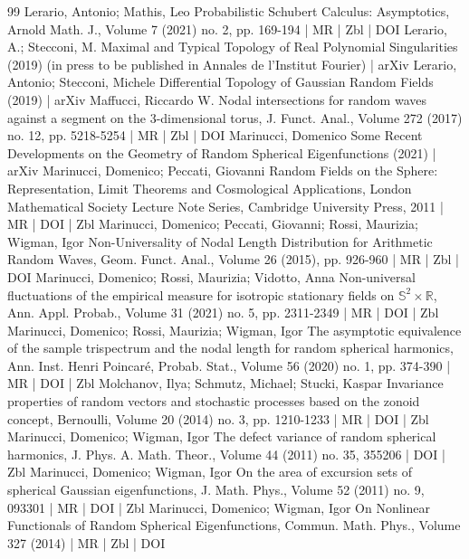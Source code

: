 \documentclass[10pt]{amsart}
\theoremstyle{definition}\newtheorem{defi}[theo]{Definition}\newtheorem{rema}[theo]{Remark}\newtheorem{exam}[theo]{Example}\newtheorem{exem}[theo]{Example}\newtheorem{nota}[theo]{Notation}
\begin{document}
\begin{thebibliography}{99}
Lerario, Antonio; Mathis, Leo Probabilistic Schubert Calculus: Asymptotics, Arnold Math. J., Volume 7 (2021) no. 2, pp. 169-194 | MR | Zbl | DOI
Lerario, A.; Stecconi, M. Maximal and Typical Topology of Real Polynomial Singularities (2019) (in press to be published in Annales de l’Institut Fourier) | arXiv
Lerario, Antonio; Stecconi, Michele Differential Topology of Gaussian Random Fields (2019) | arXiv
Maffucci, Riccardo W. Nodal intersections for random waves against a segment on the 3-dimensional torus, J. Funct. Anal., Volume 272 (2017) no. 12, pp. 5218-5254 | MR | Zbl | DOI
Marinucci, Domenico Some Recent Developments on the Geometry of Random Spherical Eigenfunctions (2021) | arXiv
Marinucci, Domenico; Peccati, Giovanni Random Fields on the Sphere: Representation, Limit Theorems and Cosmological Applications, London Mathematical Society Lecture Note Series, Cambridge University Press, 2011 | MR | DOI | Zbl
Marinucci, Domenico; Peccati, Giovanni; Rossi, Maurizia; Wigman, Igor Non-Universality of Nodal Length Distribution for Arithmetic Random Waves, Geom. Funct. Anal., Volume 26 (2015), pp. 926-960 | MR | Zbl | DOI
Marinucci, Domenico; Rossi, Maurizia; Vidotto, Anna Non-universal fluctuations of the empirical measure for isotropic stationary fields on ${\mathbb{S}^{2}}\times \mathbb{R}$, Ann. Appl. Probab., Volume 31 (2021) no. 5, pp. 2311-2349 | MR | DOI | Zbl
Marinucci, Domenico; Rossi, Maurizia; Wigman, Igor The asymptotic equivalence of the sample trispectrum and the nodal length for random spherical harmonics, Ann. Inst. Henri Poincaré, Probab. Stat., Volume 56 (2020) no. 1, pp. 374-390 | MR | DOI | Zbl
Molchanov, Ilya; Schmutz, Michael; Stucki, Kaspar Invariance properties of random vectors and stochastic processes based on the zonoid concept, Bernoulli, Volume 20 (2014) no. 3, pp. 1210-1233 | MR | DOI | Zbl
Marinucci, Domenico; Wigman, Igor The defect variance of random spherical harmonics, J. Phys. A. Math. Theor., Volume 44 (2011) no. 35, 355206 | DOI | Zbl
Marinucci, Domenico; Wigman, Igor On the area of excursion sets of spherical Gaussian eigenfunctions, J. Math. Phys., Volume 52 (2011) no. 9, 093301 | MR | DOI | Zbl
Marinucci, Domenico; Wigman, Igor On Nonlinear Functionals of Random Spherical Eigenfunctions, Commun. Math. Phys., Volume 327 (2014) | MR | Zbl | DOI

\end{thebibliography}
\end{document}
